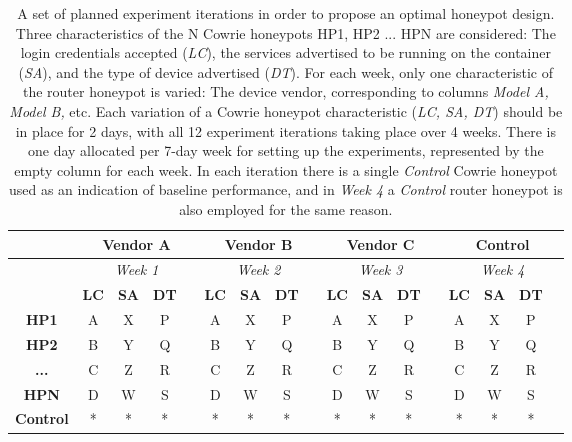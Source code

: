 \begin{table}[!h]
\begin{center}
\begin{tabular}{|*{17}{c|}}  %
\hline
\multicolumn{1}{|c}{} & \multicolumn{4}{|c|}{\textbf{Vendor A}} & \multicolumn{4}{|c|}{\textbf{Vendor B}} & \multicolumn{4}{|c|}{\textbf{Vendor C}} & \multicolumn{4}{|c|}{\textbf{Control}} \\ \hline
\multicolumn{1}{|c}{} &
\multicolumn{4}{|c}{\textit{Week 1}} & \multicolumn{4}{|c}{\textit{Week 2}} & \multicolumn{4}{|c}{\textit{Week 3}} & \multicolumn{4}{|c|}{\textit{Week 4}} \\ \hline 
 & \textbf{LC} & \textbf{SA} & \textbf{DT} &  & \textbf{LC} &\textbf{SA} & \textbf{DT} &  &\textbf{LC} & \textbf{SA} & \textbf{DT} & & \textbf{LC} &\textbf{SA} & \textbf{DT} & \\ \hline
\textbf{HP1} & A & X & P &  & A &X & P &  &A & X & P & &A & X &P &  \\ \hline
\textbf{HP2} & B & Y & Q &  & B &Y & Q &  &B & Y & Q & &B & Y &Q &  \\ \hline
\textbf{...} & C & Z & R &  & C &Z & R &  &C & Z & R & &C & Z &R &  \\ \hline
\textbf{HPN} & D & W & S &  & D &W & S &  &D & W & S & &D & W &S &  \\ \hline
\textbf{Control} & * & * & * &  & * &* & * &  &* & * & * & &* & * &* &  \\ \hline
 \end{tabular}
\end{center}
 \caption[Planned Iterations of the Honeypot Experiments]{A set of planned experiment iterations in order to propose an optimal honeypot design. Three characteristics of the N Cowrie honeypots HP1, HP2 ... HPN are considered: The login credentials accepted (\textit{LC}), the services advertised to be running on the container (\textit{SA}), and the type of device advertised (\textit{DT}). For each week, only one characteristic of the router honeypot is varied: The device vendor, corresponding to columns \textit{Model A, Model B,} etc. Each variation of a Cowrie honeypot characteristic (\textit{LC, SA, DT}) should be in place for 2 days, with all 12 experiment iterations taking place over 4 weeks. There is one day allocated per 7-day week for setting up the experiments, represented by the empty column for each week. In each iteration there is a single \textit{Control} Cowrie honeypot used as an indication of baseline performance, and in \textit{Week 4} a \textit{Control} router honeypot is also employed for the same reason.}	
\label{table:HoneypotExperimentsTable}
\end{table}

